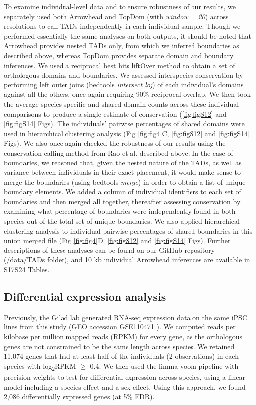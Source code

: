 To examine individual-level data and to ensure robustness of our results, we separately used both Arrowhead \cite{Durand.2016} and TopDom \cite{Shin.2016} (with \textit{window = 20}) across resolutions to call TADs independently in each individual sample. Though we performed essentially the same analyses on both outputs, it should be noted that Arrowhead provides nested TADs only, from which we inferred boundaries as described above, whereas TopDom provides separate domain and boundary inferences. We used a reciprocal best hits liftOver method \cite{Ward.2014, Kent.2002} to obtain a set of orthologous domains and boundaries. We assessed interspecies conservation by performing left outer joins (bedtools \textit{intersect {\textendash}loj}) of each individual's domains against all the others, once again requiring 90\% reciprocal overlap. We then took the average species-specific and shared domain counts across these individual comparisons to produce a single estimate of conservation (\ref{fig:figS12} and \ref{fig:figS14} Figs). The individuals' pairwise percentages of shared domains were used in hierarchical clustering analysis (Fig \ref{fig:fig4}C, \ref{fig:figS12} and \ref{fig:figS14} Figs). We also once again checked the robustness of our results using the conservation calling method from Rao et al. \cite{Rao.2014} described above. In the case of boundaries, we reasoned that, given the nested nature of the TADs, as well as variance between individuals in their exact placement, it would make sense to merge the boundaries (using bedtools \textit{merge}) in order to obtain a list of unique boundary elements. We added a column of individual identifiers to each set of boundaries and then merged all together, thereafter assessing conservation by examining what percentage of boundaries were independently found in both species out of the total set of unique boundaries. We also applied hierarchical clustering analysis to individual pairwise percentages of shared boundaries in this union merged file (Fig \ref{fig:fig4}D, \ref{fig:figS12} and \ref{fig:figS14} Figs). Further descriptions of these analyses can be found on our GitHub repository (/data/TADs folder), and 10 kb individual Arrowhead inferences are available in S17{\textendash}S24 Tables.

\subsection{Differential expression analysis}

Previously, the Gilad lab generated RNA-seq expression data on the same iPSC lines from this study (GEO accession GSE110471 \cite{Pavlovic.2018}). We computed reads per kilobase per million mapped reads (RPKM) for every gene, as the orthologous genes are not constrained to be the same length across species. We retained 11,074 genes that had at least half of the individuals (2 observations) in each species with log\textsubscript{2}RPKM ${\geq}$ 0.4. We then used the limma-voom pipeline with precision weights \cite{Smyth.2004, Law.2014} to test for differential expression across species, using a linear model including a species effect and a sex effect. Using this approach, we found 2,086 differentially expressed genes (at 5\% FDR).

